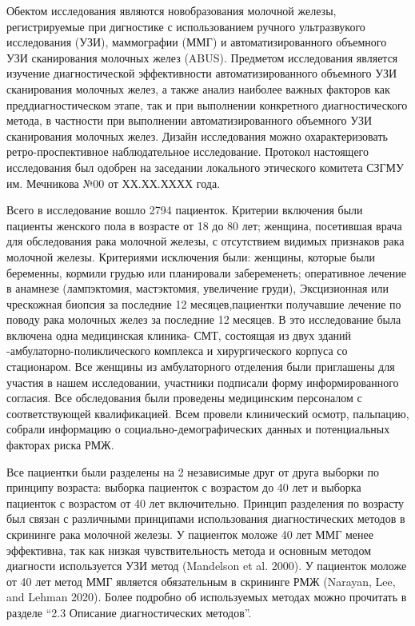 \documentclass[
]{article}
\begin{document}
Обектом исследования являются новобразования молочной железы,
регистрируемые при дигностике с использованием ручного ультразвукого
исследования (УЗИ), маммографии (ММГ) и автоматизированного объемного
УЗИ сканирования молочных желез (ABUS). Предметом исследования является
изучение диагностической эффективности автоматизированного объемного УЗИ
сканирования молочных желез, а также анализ наиболее важных факторов как
преддиагностическом этапе, так и при выполнении конкретного
диагностического метода, в частности при выполнении автоматизированного
объемного УЗИ сканирования молочных желез. Дизайн исследования можно
охарактеризовать ретро-проспективное наблюдательное исследование.
Протокол настоящего исследования был одобрен на заседании локального
этического комитета СЗГМУ им. Мечникова №00 от ХХ.ХХ.ХХХХ года.

Всего в исследование вошло 2794 пациенток. Критерии включения были
пациенты женского пола в возрасте от 18 до 80 лет; женщина, посетившая
врача для обследования рака молочной железы, с отсутствием видимых
признаков рака молочной железы. Критериями исключения были: женщины,
которые были беременны, кормили грудью или планировали забеременеть;
оперативное лечение в анамнезе (лампэктомия, мастэктомия, увеличение
груди), Эксцизионная или чрескожная биопсия за последние 12
месяцев,пациентки получавшие лечение по поводу рака молочных желез за
последние 12 месяцев. В это исследование была включена одна медицинская
клиника- СМТ, состоящая из двух зданий -амбулаторно-поликлического
комплекса и хирургического корпуса со стационаром. Все женщины из
амбулаторного отделения были приглашены для участия в нашем
исследовании, участники подписали форму информированного согласия. Все
обследования были проведены медицинским персоналом с соответствующей
квалификацией. Всем провели клинический осмотр, пальпацию, собрали
информацию о социально-демографических данных и потенциальных факторах
риска РМЖ.

Все пациентки были разделены на 2 независимые друг от друга выборки по
принципу возраста: выборка пациенток с возрастом до 40 лет и выборка
пациенток с возрастом от 40 лет включительно. Принцип разделения по
возрасту был связан с различными принципами использования
диагностических методов в скрининге рака молочной железы. У пациенток
моложе 40 лет ММГ менее эффективна, так как низкая чувствительность
метода и основным методом диагности используется УЗИ метод (Mandelson et
al. 2000). У пациенток моложе от 40 лет метод ММГ является обязательным
в скрининге РМЖ (Narayan, Lee, and Lehman 2020). Более подробно об
используемых методах можно прочитать в разделе ``2.3 Описание
диагностических методов''.
\end{document}
